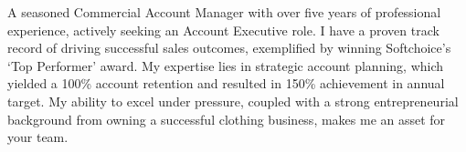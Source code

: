 \begin{cvletter}


A seasoned Commercial Account Manager with over five years of professional experience, actively seeking an Account Executive role. I have a proven track record of driving successful sales outcomes, exemplified by winning Softchoice's `Top Performer' award. My expertise lies in strategic account planning, which yielded a 100\% account retention and resulted in 150\% achievement in annual target. My ability to excel under pressure, coupled with a strong entrepreneurial background from owning a successful clothing business, makes me an asset for your team. %


\end{cvletter}